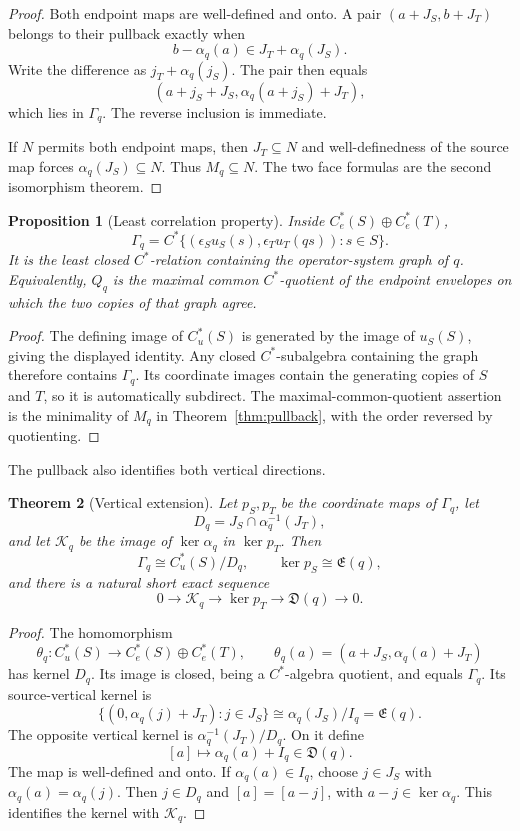 \documentclass[11pt,a4paper]{amsart}
\theoremstyle{plain}
\newtheorem{theorem}{Theorem}[section]
\newtheorem{proposition}[theorem]{Proposition}
\theoremstyle{definition}
\newcommand{\Cu}{C_u^*}
\newcommand{\Ce}{C_e^*}
\newcommand{\Esc}{\mathfrak E}
\newcommand{\Def}{\mathfrak D}
\begin{document}
\begin{proof}
Both endpoint maps are well-defined and onto.  A pair
\((a+J_S,b+J_T)\) belongs to their pullback exactly when
\[
 b-\alpha_q(a)\in J_T+\alpha_q(J_S).
\]
Write the difference as $j_T+\alpha_q(j_S)$.  The pair then equals
\[
 (a+j_S+J_S,\alpha_q(a+j_S)+J_T),
\]
which lies in $\Gamma_q$.  The reverse inclusion is immediate.

If $N$ permits both endpoint maps, then $J_T\subseteq N$ and well-definedness of the source map
forces $\alpha_q(J_S)\subseteq N$.  Thus $M_q\subseteq N$.  The two face formulas are the
second isomorphism theorem.
\end{proof}

\begin{proposition}[Least correlation property]\label{prop:least}
Inside \(\Ce(S)\oplus\Ce(T)\),
\[
 \Gamma_q=C^*\{(\epsilon_Su_S(s),\epsilon_Tu_T(qs)):s\in S\}.
\]
It is the least closed \(C^*\)-relation containing the operator-system graph of \(q\).
Equivalently, \(Q_q\) is the maximal common \(C^*\)-quotient of the endpoint envelopes on which
the two copies of that graph agree.
\end{proposition}

\begin{proof}
The defining image of \(\Cu(S)\) is generated by the image of
\(u_S(S)\), giving the displayed identity.  Any closed \(C^*\)-subalgebra containing the graph
therefore contains \(\Gamma_q\).  Its coordinate images contain the generating copies of \(S\)
and \(T\), so it is automatically subdirect.  The maximal-common-quotient assertion is the
minimality of \(M_q\) in Theorem~\ref{thm:pullback}, with the order reversed by quotienting.
\end{proof}

The pullback also identifies both vertical directions.

\begin{theorem}[Vertical extension]\label{thm:vertical}
Let $p_S,p_T$ be the coordinate maps of $\Gamma_q$, let
\[
 D_q=J_S\cap\alpha_q^{-1}(J_T),
\]
and let $\mathcal K_q$ be the image of $\ker\alpha_q$ in $\ker p_T$.  Then
\[
 \Gamma_q\cong\Cu(S)/D_q,\qquad
 \ker p_S\cong\Esc(q),
\]
and there is a natural short exact sequence
\[
 0\longrightarrow\mathcal K_q\longrightarrow\ker p_T
 \longrightarrow\Def(q)\longrightarrow0.
\]
\end{theorem}

\begin{proof}
The homomorphism
\[
 \theta_q:\Cu(S)\longrightarrow\Ce(S)\oplus\Ce(T),\qquad
 \theta_q(a)=(a+J_S,\alpha_q(a)+J_T)
\]
has kernel $D_q$.  Its image is closed, being a $C^*$-algebra quotient, and equals
$\Gamma_q$.  Its source-vertical kernel is
\[
 \{(0,\alpha_q(j)+J_T):j\in J_S\}
 \cong\alpha_q(J_S)/I_q=\Esc(q).
\]
The opposite vertical kernel is $\alpha_q^{-1}(J_T)/D_q$.  On it define
\[
 [a]\longmapsto\alpha_q(a)+I_q\in\Def(q).
\]
The map is well-defined and onto.  If $\alpha_q(a)\in I_q$, choose $j\in J_S$ with
$\alpha_q(a)=\alpha_q(j)$.  Then $j\in D_q$ and $[a]=[a-j]$, with
$a-j\in\ker\alpha_q$.  This identifies the kernel with $\mathcal K_q$.
\end{proof}
\end{document}
